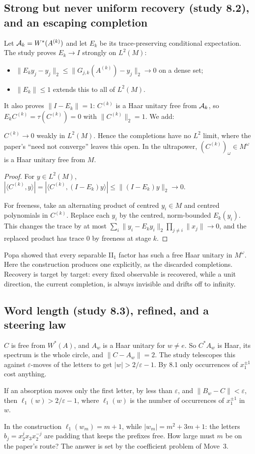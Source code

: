 \subsection{Strong but never uniform recovery (study 8.2), and an escaping completion}
Let $\mathcal A_k=W^*(A^{(k)})$ and let $E_k$ be its trace-preserving conditional expectation. The study proves $E_k\to I$ strongly on $L^2(M)$:
\begin{itemize}[leftmargin=*]
\item $\|E_ky_j-y_j\|_2\le\|G_{j,k}(A^{(k)})-y_j\|_2\to0$ on a dense set;
\item $\|E_k\|\le1$ extends this to all of $L^2(M)$.
\end{itemize}
It also proves $\|I-E_k\|=1$: $C^{(k)}$ is a Haar unitary free from $\mathcal A_k$, so $E_kC^{(k)}=\tau(C^{(k)})=0$ with $\|C^{(k)}\|_2=1$. We add:
\begin{proposition}
$C^{(k)}\to0$ weakly in $L^2(M)$. Hence the completions have no $L^2$ limit, where the paper's ``need not converge'' leaves this open. In the
ultrapower, $(C^{(k)})_\omega\in M^\omega$ is a Haar unitary free from $M$.
\end{proposition}
\begin{proof}
For $y\in L^2(M)$, $|\langle C^{(k)},y\rangle|=|\langle C^{(k)},(I-E_k)y\rangle|\le\|(I-E_k)y\|_2\to0$.

For freeness, take an alternating product of centred $y_i\in M$ and centred polynomials in $C^{(k)}$. Replace each $y_i$ by the centred, norm-bounded
$E_k(y_i)$. This changes the trace by at most $\sum_i\|y_i-E_ky_i\|_2\prod_{j\ne i}\|x_j\|\to0$, and the replaced product has trace $0$ by freeness at stage
$k$.
\end{proof}
Popa showed that every separable II$_1$ factor has such a free Haar unitary in $M^\omega$. Here the construction produces one explicitly, as the
discarded completions. Recovery is target by target: every fixed observable is recovered, while a unit direction, the current completion, is
always invisible and drifts off to infinity.

\subsection{Word length (study 8.3), refined, and a steering law}
$C$ is free from $W^*(A)$, and $A_w$ is a Haar unitary for $w\ne e$. So $C^*A_w$ is Haar, its spectrum is the whole circle, and $\|C-A_w\|=2$. The study
telescopes this against $\varepsilon$-moves of the letters to get $|w|>2/\varepsilon-1$. By 8.1 only occurrences of $x_1^{\pm1}$ cost anything.
\begin{proposition}
If an absorption moves only the first letter, by less than $\varepsilon$, and $\|B_w-C\|<\varepsilon$, then $\ell_1(w)>2/\varepsilon-1$, where $\ell_1(w)$ is the number of
occurrences of $x_1^{\pm1}$ in $w$.
\end{proposition}
In the construction $\ell_1(w_m)=m+1$, while $|w_m|=m^2+3m+1$: the letters $b_j=x_2^jx_3x_2^{-j}$ are padding that keeps the prefixes free. How
large must $m$ be on the paper's route? The answer is set by the coefficient problem of Move~3.

